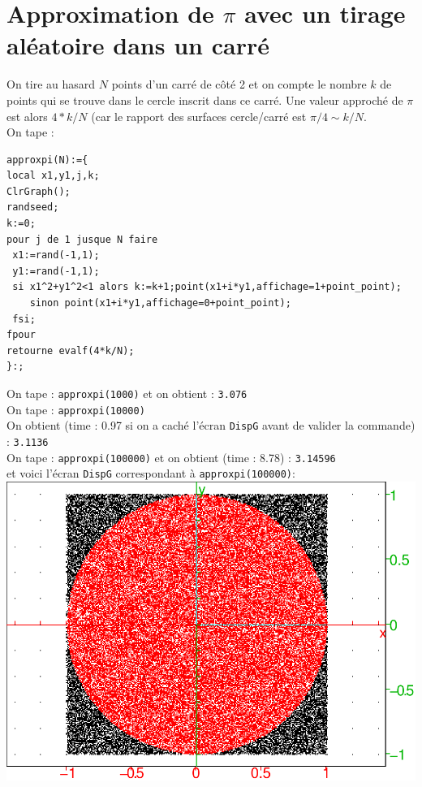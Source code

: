 \documentclass[a4paper,11pt]{book}
\begin{document}
\section{Approximation de $\pi$ avec un tirage al\'eatoire dans un carr\'e}
On tire au hasard $N$ points d'un carr\'e de c\^ot\'e 2 et on compte le nombre 
$k$ de points qui se trouve dans le cercle inscrit dans ce carr\'e.
Une valeur approch\'e de $\pi$ est alors $4*k/N$ (car le rapport des surfaces
cercle/carr\'e est $\pi/4\sim k/N$.\\
On tape :
\begin{verbatim}
approxpi(N):={
local x1,y1,j,k;
ClrGraph();
randseed;
k:=0;
pour j de 1 jusque N faire
 x1:=rand(-1,1);
 y1:=rand(-1,1);
 si x1^2+y1^2<1 alors k:=k+1;point(x1+i*y1,affichage=1+point_point); 
    sinon point(x1+i*y1,affichage=0+point_point);
 fsi;
fpour
retourne evalf(4*k/N);
}:;
\end{verbatim} 
On tape :
{\tt approxpi(1000)}
et on obtient :
{\tt 3.076}\\
On tape :
{\tt approxpi(10000)}\\
On obtient (time : 0.97 si on a cach\'e l'\'ecran {\tt DispG} avant de valider la commande) :
{\tt 3.1136}\\
On tape : {\tt approxpi(100000)} et on obtient (time : 8.78) : {\tt 3.14596}\\
et voici l'\'ecran {\tt DispG} correspondant \`a {\tt approxpi(100000)}:\\
\includegraphics[width=\textwidth]{approxpi}
\end{document}
